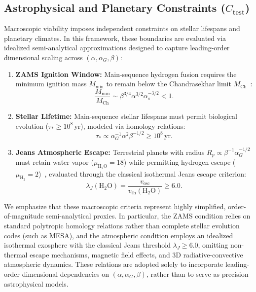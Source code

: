 \documentclass[aps,prd,twocolumn,superscriptaddress,nofootinbib,floatfix]{revtex4-2}
\begin{document}
\subsection{Astrophysical and Planetary Constraints ($C_{\text{test}}$)}

Macroscopic viability imposes independent constraints on stellar lifespans and planetary climates. In this framework, these boundaries are evaluated via idealized semi-analytical approximations designed to capture leading-order dimensional scaling across $(\alpha, \alpha_G, \beta)$:
\begin{enumerate}
    \item \textbf{ZAMS Ignition Window:} Main-sequence hydrogen fusion requires the minimum ignition mass $M_{\text{min}}$ to remain below the Chandrasekhar limit $M_{\text{Ch}}$~\cite{Chandrasekhar1939,Adams2008}:
    \begin{equation}
        \frac{M_{\text{min}}}{M_{\text{Ch}}} \sim \beta^{3/4} \alpha^{3/2} \alpha_s^{-3/2} < 1.
    \end{equation}
    \item \textbf{Stellar Lifetime:} Main-sequence stellar lifespans must permit biological evolution ($\tau_* \ge 10^8\,\text{yr}$), modeled via homology relations:
    \begin{equation}
        \tau_* \propto \alpha_G^{-1} \alpha^2 \beta^{-1/2} \ge 10^8\,\text{yr}.
    \end{equation}
    \item \textbf{Jeans Atmospheric Escape:} Terrestrial planets with radius $R_p \propto \beta^{-1} \alpha_G^{-1/2}$ must retain water vapor ($\mu_{\mathrm{H_2O}} = 18$) while permitting hydrogen escape ($\mu_{\mathrm{H_2}} = 2$)~\cite{Kopparapu2013}, evaluated through the classical isothermal Jeans escape criterion:
    \begin{equation}
        \lambda_J(\mathrm{H_2O}) = \frac{v_{\text{esc}}}{v_{\text{th}}(\mathrm{H_2O})} \ge 6.0.
    \end{equation}
\end{enumerate}
We emphasize that these macroscopic criteria represent highly simplified, order-of-magnitude semi-analytical proxies. In particular, the ZAMS condition relies on standard polytropic homology relations rather than complete stellar evolution codes (such as MESA), and the atmospheric condition employs an idealized isothermal exosphere with the classical Jeans threshold $\lambda_J \ge 6.0$, omitting non-thermal escape mechanisms, magnetic field effects, and 3D radiative-convective atmospheric dynamics. These relations are adopted solely to incorporate leading-order dimensional dependencies on $(\alpha, \alpha_G, \beta)$, rather than to serve as precision astrophysical models.
\end{document}
